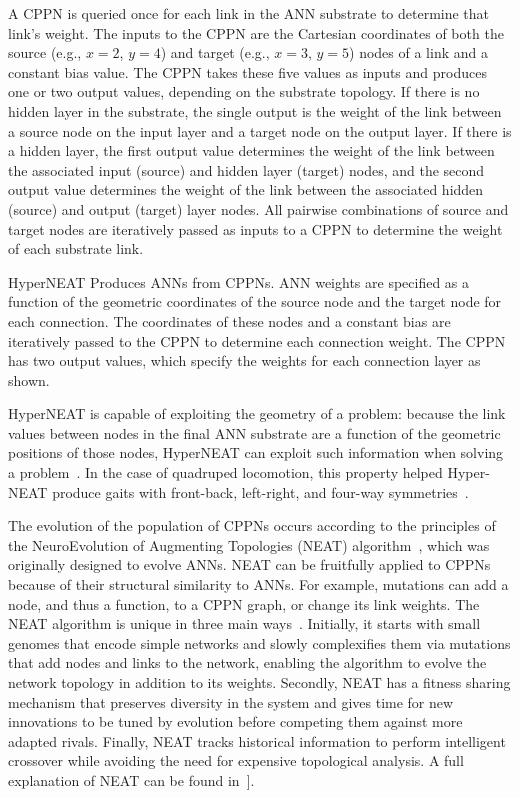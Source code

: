 \begin{itemize}
A CPPN is queried once for each link in the ANN substrate to determine that link's weight. The inputs to the CPPN are the Cartesian coordinates of both the source (e.g., $x = 2$, $y = 4$) and target (e.g., $x = 3$, $y = 5$) nodes of a link and a constant bias value. The CPPN takes these five values as inputs and produces one or two output values, depending on the substrate topology. If there is no hidden layer in the substrate, the single output is the weight of the link between a source node on the input layer and a target node on the output layer. If there is a hidden layer, the first output value determines the weight of the link between the associated input (source) and hidden layer (target) nodes, and the second output value determines the weight of the link between the associated hidden (source) and output (target) layer nodes. All pairwise combinations of source and target nodes are iteratively passed as inputs to a CPPN to determine the weight of each substrate link. 

HyperNEAT Produces ANNs from CPPNs. ANN weights are specified as a function of the geometric coordinates of the source node and the target node for each connection. The coordinates of these nodes and a constant bias are iteratively passed to the CPPN to determine each connection weight. The CPPN has two output values, which specify the weights for each connection layer as shown. 

HyperNEAT is capable of exploiting the geometry of a problem: because the link values between nodes in the final ANN substrate are a function of the geometric positions of those nodes, HyperNEAT can exploit such information when solving a problem~\cite{stanley2009hypercube, clune2009sensitivity, clune2011performance}. In the case of quadruped locomotion, this property helped Hyper-NEAT produce gaits with front-back, left-right, and four-way symmetries~\cite{clune2009evolving, clune2011performance}.
  
The evolution of the population of CPPNs occurs according to the principles of the NeuroEvolution of Augmenting Topologies (NEAT) algorithm~\cite{stanley2002evolving}, which was originally designed to evolve ANNs. NEAT can be fruitfully applied to CPPNs because of their structural similarity to ANNs. For example, mutations can add a node, and thus a function, to a CPPN graph, or change its link weights. The NEAT algorithm is unique in three main ways~\cite{stanley2002evolving}. Initially, it starts with small genomes that encode simple networks and slowly complexifies them via mutations that add nodes and links to the network, enabling the algorithm to evolve the network topology in addition to its weights. Secondly, NEAT has a fitness sharing mechanism that preserves diversity in the system and gives time for new innovations to be tuned by evolution before competing them against more adapted rivals. Finally, NEAT tracks historical information to perform intelligent crossover while avoiding the need for expensive topological analysis. A full explanation of NEAT can be found in~\cite{stanley2002evolving}]. 
  

\end{itemize}
